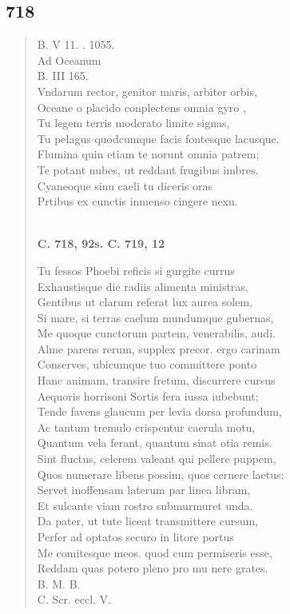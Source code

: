 \documentclass[11pt, a4paper]{report}
\begin{document}
            \subsection*{718}
      \begin{verse}
      B. V 11. . 1055. \\ Ad Oceanum \\ B. III 165. \\ Vndarum rector, genitor maris, arbiter orbis, \\ Oceane o placido conplectens omnia  \lbrack gyro \rbrack , \\ Tu legem terris moderato limite signas, \\ Tu pelagus quodcumque facis fontesque lacusque. \\ Flumina quin etiam te norunt omnia patrem; \\ Te potant nubes, ut reddant frugibus imbres. \\ Cyaneoque sinu caeli tu diceris oras \\ Prtibus ex cunctis inmenso cingere nexu. \\ 
        ﻿\pagebreak 
    \begin{center} \textbf{C. 718, 92s. C. 719, 12} \end{center} \marginpar{[184]} Tu fessos Phoebi reficis si gurgite currus \\ Exhaustisque die radiis alimenta ministras, \\ Gentibus ut clarum referat lux aurea solem, \\ Si mare, si terras caelum mundumque gubernas, \\ Me quoque cunctorum partem, venerabilis, audi. \\ Alme parens rerum, supplex precor. ergo carinam \\ Conserves, ubicumque tuo committere ponto \\ Hanc animam, transire fretum, discurrere cursus \\ Aequoris horrisoni Sortis fera iussa iubebunt; \\ Tende favens glaucum per levia dorsa profundum, \\ Ac tantum tremulo crispentur caerula motu, \\ Quantum vela ferant, quantum sinat otia remis. \\ Sint fluctus, celerem valeant qui pellere puppem, \\ Quos numerare libens possim, quos cernere laetus: \\ Servet inoffensam laterum par linea libram, \\ Et sulcante viam rostro submurmuret unda. \\ Da pater, ut tute liceat transmittere cursum, \\ Perfer ad optatos securo in litore portus \\ Me comitesque meos. quod cum permiseris esse, \\ Reddam quas potero pleno pro mu \lbrack nere \rbrack  grates. \\ B. M. B. \\ C. Scr. eccl. V. \\ 
      \end{verse}
  
\end{document}
